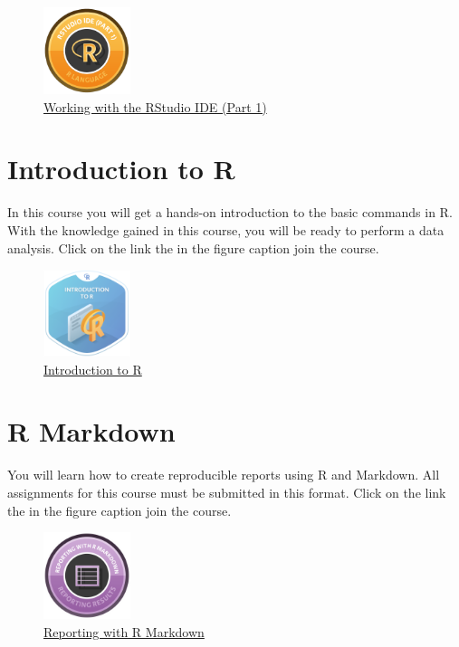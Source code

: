 \documentclass[letterpaper,9pt,twocolumn,twoside,printwatermark=false]{pinp}
\begin{document}
\begin{figure}[H]
  \begin{center}
    \includegraphics[width=1in, height=1in]{../../images/rstudio_ide.png} 
  \end{center}
  \caption{\href{https://www.datacamp.com/courses/working-with-the-rstudio-ide-part-1}{Working with the RStudio IDE (Part 1)}}\label{fig}
\end{figure}

\section{Introduction to R}\label{introduction-to-r}

In this course you will get a hands-on introduction to the basic
commands in R. With the knowledge gained in this course, you will be
ready to perform a data analysis. Click on the link the in the figure
caption join the course.

\begin{figure}[H]
  \begin{center}
    \includegraphics[width=1in, height=1in]{../../images/intro_r.png} 
  \end{center}
  \caption{\href{https://www.datacamp.com/courses/free-introduction-to-r}{Introduction to R}}\label{fig}
\end{figure}

\section{R Markdown}\label{r-markdown}

You will learn how to create reproducible reports using R and Markdown.
All assignments for this course must be submitted in this format. Click
on the link the in the figure caption join the course.

\begin{figure}[H]
  \begin{center}
    \includegraphics[width=1in, height=1in]{../../images/rmarkdown_r.png} 
  \end{center}
  \caption{\href{https://www.datacamp.com/courses/reporting-with-r-markdown}{Reporting with R Markdown}}\label{fig}
\end{figure}
\end{document}
